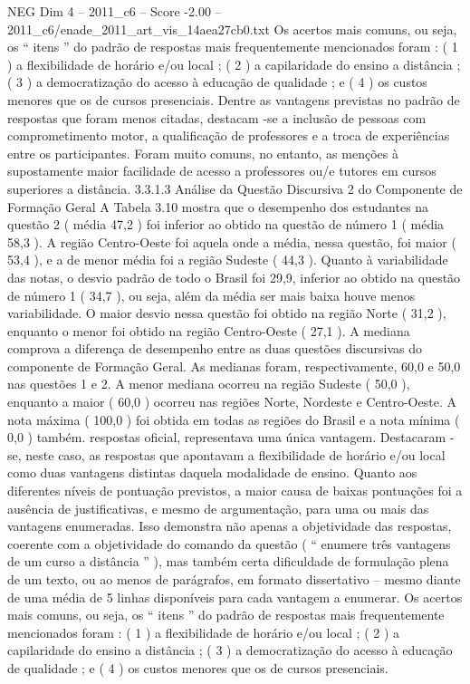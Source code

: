 \begin{textsample}{NEG Dim 4 – 2011\_c6 – Score -2.00 – 2011\_c6/enade\_2011\_art\_vis\_14aea27cb0.txt}
Os acertos mais comuns, ou seja, os “ itens ” do padrão de respostas mais frequentemente mencionados foram : ( 1 ) a flexibilidade de horário e/ou local ; ( 2 ) a capilaridade do ensino a distância ; ( 3 ) a democratização do acesso à educação de qualidade ; e ( 4 ) os custos menores que os de cursos presenciais.
Dentre as vantagens previstas no padrão de respostas que foram menos citadas, destacam -se a inclusão de pessoas com comprometimento motor, a qualificação de professores e a troca de experiências entre os participantes.
Foram muito comuns, no entanto, as menções à supostamente maior facilidade de acesso a professores ou/e tutores em cursos superiores a distância. 3.3.1.3 Análise da Questão Discursiva 2 do Componente de Formação Geral A Tabela 3.10 mostra que o desempenho dos estudantes na questão 2 ( média 47,2 ) foi inferior ao obtido na questão de número 1 ( média 58,3 ).
A região Centro-Oeste foi aquela onde a média, nessa questão, foi maior ( 53,4 ), e a de menor média foi a região Sudeste ( 44,3 ).
Quanto à variabilidade das notas, o desvio padrão de todo o Brasil foi 29,9, inferior ao obtido na questão de número 1 ( 34,7 ), ou seja, além da média ser mais baixa houve menos variabilidade.
O maior desvio nessa questão foi obtido na região Norte ( 31,2 ), enquanto o menor foi obtido na região Centro-Oeste ( 27,1 ).
A mediana comprova a diferença de desempenho entre as duas questões discursivas do componente de Formação Geral.
As medianas foram, respectivamente, 60,0 e 50,0 nas questões 1 e 2.
A menor mediana ocorreu na região Sudeste ( 50,0 ), enquanto a maior ( 60,0 ) ocorreu nas regiões Norte, Nordeste e Centro-Oeste.
A nota máxima ( 100,0 ) foi obtida em todas as regiões do Brasil e a nota mínima ( 0,0 ) também. respostas oficial, representava uma única vantagem.
Destacaram -se, neste caso, as respostas que apontavam a flexibilidade de horário e/ou local como duas vantagens distintas daquela modalidade de ensino.
Quanto aos diferentes níveis de pontuação previstos, a maior causa de baixas pontuações foi a ausência de justificativas, e mesmo de argumentação, para uma ou mais das vantagens enumeradas.
Isso demonstra não apenas a objetividade das respostas, coerente com a objetividade do comando da questão ( “ enumere três vantagens de um curso a distância ” ), mas também certa dificuldade de formulação plena de um texto, ou ao menos de parágrafos, em formato dissertativo – mesmo diante de uma média de 5 linhas disponíveis para cada vantagem a enumerar.
Os acertos mais comuns, ou seja, os “ itens ” do padrão de respostas mais frequentemente mencionados foram : ( 1 ) a flexibilidade de horário e/ou local ; ( 2 ) a capilaridade do ensino a distância ; ( 3 ) a democratização do acesso à educação de qualidade ; e ( 4 ) os custos menores que os de cursos presenciais.

\end{textsample}
